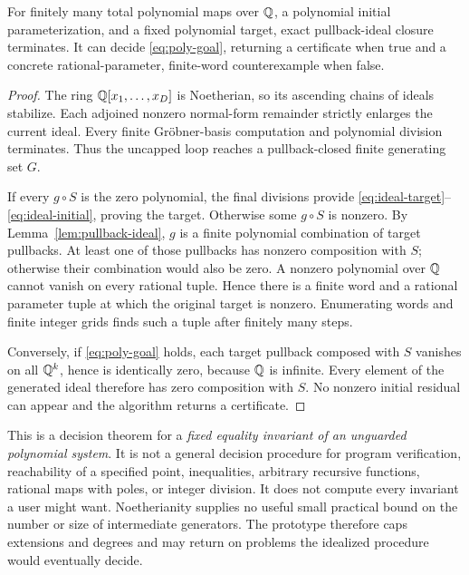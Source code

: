 \begin{theorem}\label{thm:ideal-complete}
For finitely many total polynomial maps over $\mathbb Q$, a polynomial initial
parameterization, and a fixed polynomial target, exact pullback-ideal closure
terminates. It can decide \eqref{eq:poly-goal}, returning a certificate when true
and a concrete rational-parameter, finite-word counterexample when false.
\end{theorem}
\begin{proof}
The ring $\mathbb Q[x_1,\ldots,x_D]$ is Noetherian, so its ascending chains of ideals
stabilize. Each adjoined nonzero normal-form remainder strictly enlarges the
current ideal. Every finite Gr\"obner-basis computation and polynomial division
terminates. Thus the uncapped loop reaches a pullback-closed finite generating
set $G$.

If every $g\circ S$ is the zero polynomial, the final divisions provide
\eqref{eq:ideal-target}--\eqref{eq:ideal-initial}, proving the target.
Otherwise some $g\circ S$ is nonzero. By Lemma~\ref{lem:pullback-ideal}, $g$ is
a finite polynomial combination of target pullbacks. At least one of those
pullbacks has nonzero composition with $S$; otherwise their combination would
also be zero. A nonzero polynomial over $\mathbb Q$ cannot vanish on every rational
tuple. Hence there is a finite word and a rational parameter tuple at which the
original target is nonzero. Enumerating words and finite integer grids finds
such a tuple after finitely many steps.

Conversely, if \eqref{eq:poly-goal} holds, each target pullback composed with
$S$ vanishes on all $\mathbb Q^k$, hence is identically zero, because $\mathbb Q$ is infinite.
Every element of the generated ideal therefore has zero composition with $S$.
No nonzero initial residual can appear and the algorithm returns a certificate.
\end{proof}

This is a decision theorem for a \emph{fixed equality invariant of an unguarded
polynomial system}. It is not a general decision procedure for program
verification, reachability of a specified point, inequalities, arbitrary
recursive functions, rational maps with poles, or integer division. It does not
compute every invariant a user might want. Noetherianity supplies no useful
small practical bound on the number or size of intermediate generators. The
prototype therefore caps extensions and degrees and may return \Unknown on
problems the idealized procedure would eventually decide.

